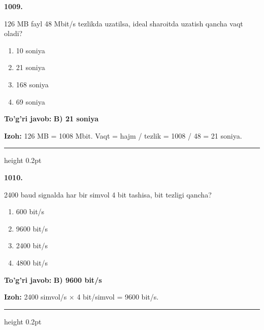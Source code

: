 \documentclass[10pt,a4paper,oneside]{article}
\begin{document}
\noindent\textbf{\color{ink}1009.}
\par
126 MB fayl 48 Mbit/s tezlikda uzatilsa, ideal sharoitda uzatish qancha vaqt oladi?
\begin{enumerate}[label=\Alph*),leftmargin=9mm]
\item 10 soniya
\item 21 soniya
\item 168 soniya
\item 69 soniya
\end{enumerate}
\begin{tcolorbox}[enhanced,breakable,colback=teal!4,colframe=teal!50!black,boxrule=0.5pt,arc=1.1mm,left=3mm,right=3mm,top=1.7mm,bottom=1.7mm,before skip=2mm,after skip=2mm]
\textbf{\color{teal}To'g'ri javob:} \textbf{B) 21 soniya}
\par\smallskip
\textbf{Izoh:} 126 MB = 1008 Mbit. Vaqt = hajm / tezlik = 1008 / 48 = 21 soniya.
\end{tcolorbox}
\vspace{2mm}\hrule height 0.2pt \vspace{3mm}

\noindent\textbf{\color{ink}1010.}
\par
2400 baud signalda har bir simvol 4 bit tashisa, bit tezligi qancha?
\begin{enumerate}[label=\Alph*),leftmargin=9mm]
\item 600 bit/s
\item 9600 bit/s
\item 2400 bit/s
\item 4800 bit/s
\end{enumerate}
\begin{tcolorbox}[enhanced,breakable,colback=teal!4,colframe=teal!50!black,boxrule=0.5pt,arc=1.1mm,left=3mm,right=3mm,top=1.7mm,bottom=1.7mm,before skip=2mm,after skip=2mm]
\textbf{\color{teal}To'g'ri javob:} \textbf{B) 9600 bit/s}
\par\smallskip
\textbf{Izoh:} 2400 simvol/s \ensuremath{\times} 4 bit/simvol = 9600 bit/s.
\end{tcolorbox}
\vspace{2mm}\hrule height 0.2pt \vspace{3mm}
\end{document}
